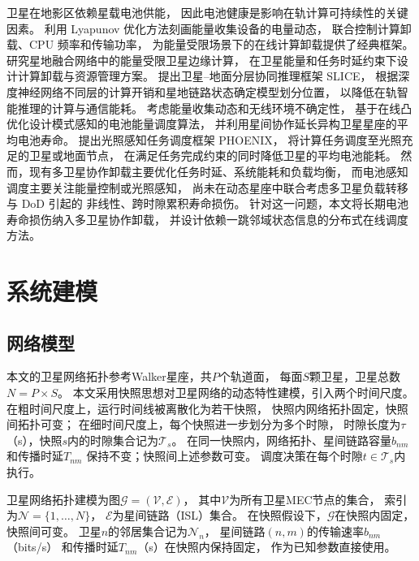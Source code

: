 \documentclass[a4paper,11pt]{article}
\begin{document}
卫星在地影区依赖星载电池供能，
因此电池健康是影响在轨计算可持续性的关键因素。
\cite{mao2016eh}利用 Lyapunov 优化方法刻画能量收集设备的电量动态，
联合控制计算卸载、CPU 频率和传输功率，
为能量受限场景下的在线计算卸载提供了经典框架。
\cite{energyconstrained}研究星地融合网络中的能量受限卫星边缘计算，
在卫星能量和任务时延约束下设计计算卸载与资源管理方案。
\cite{chen2025slice}提出卫星--地面分层协同推理框架 SLICE，
根据深度神经网络不同层的计算开销和星地链路状态确定模型划分位置，
以降低在轨智能推理的计算与通信能耗。
\cite{li2024battery}考虑能量收集动态和无线环境不确定性，
基于在线凸优化设计模式感知的电池能量调度算法，
并利用星间协作延长异构卫星星座的平均电池寿命。
\cite{liu2024phoenix}提出光照感知任务调度框架 PHOENIX，
将计算任务调度至光照充足的卫星或地面节点，
在满足任务完成约束的同时降低卫星的平均电池能耗。
然而，现有多卫星协作卸载主要优化任务时延、系统能耗和负载均衡，
而电池感知调度主要关注能量控制或光照感知，
尚未在动态星座中联合考虑多卫星负载转移与 DoD 引起的
非线性、跨时隙累积寿命损伤。
针对这一问题，本文将长期电池寿命损伤纳入多卫星协作卸载，
并设计依赖一跳邻域状态信息的分布式在线调度方法。
\section{系统建模}
\label{sec:system_model}

\subsection{网络模型}

本文的卫星网络拓扑参考Walker星座，共$P$个轨道面，
每面$S$颗卫星，卫星总数$N = P \times S$。
本文采用快照思想对卫星网络的动态特性建模，引入两个时间尺度。
在粗时间尺度上，运行时间线被离散化为若干快照，
快照内网络拓扑固定，快照间拓扑可变；
在细时间尺度上，每个快照进一步划分为多个时隙，
时隙长度为$\tau$（s），快照$s$内的时隙集合记为$\mathcal{T}_s$。
在同一快照内，网络拓扑、星间链路容量$b_{nm}$和传播时延$T_{nm}$
保持不变；快照间上述参数可变。
调度决策在每个时隙$t \in \mathcal{T}_s$内执行。

卫星网络拓扑建模为图$\mathcal{G} = (\mathcal{V}, \mathcal{E})$，
其中$\mathcal{V}$为所有卫星MEC节点的集合，
索引为$\mathcal{N} = \{1, \ldots, N\}$，
$\mathcal{E}$为星间链路（ISL）集合。
在快照假设下，$\mathcal{G}$在快照内固定，快照间可变。
卫星$n$的邻居集合记为$\mathcal{N}_n$，
星间链路$(n,m)$的传输速率$b_{nm}$（bits/s）
和传播时延$T_{nm}$（s）在快照内保持固定，
作为已知参数直接使用。
\end{document}
